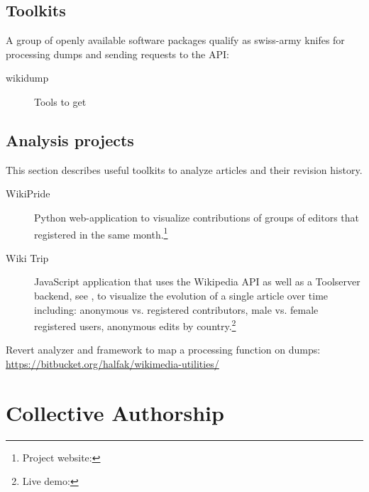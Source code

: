 \subsection{Toolkits}

A group of openly available software packages qualify as swiss-army knifes for processing dumps and sending requests to the API:

\begin{description}
\item[wikidump] Tools to get
\end{description}

\subsection{Analysis projects}

This section describes useful toolkits to analyze articles and their revision history.

\begin{description}
\item[WikiPride] Python web-application  to visualize contributions of groups of editors that registered in the same month.\footnote{Project website: }
\item[Wiki Trip] JavaScript application that uses the Wikipedia API as well as a Toolserver backend, see , to visualize the evolution of a single article over time including: anonymous vs. registered contributors, male vs. female registered users, anonymous edits by country.\footnote{Live demo: } 
\item[] 
\end{description}


\begin{todos}
\item Revert analyzer and framework to map a processing function on dumps: \url{https://bitbucket.org/halfak/wikimedia-utilities/}
\end{todos}


\section{Collective Authorship}


